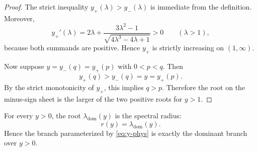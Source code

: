 \begin{proof}
The strict inequality \(y_+(\lambda)>y_-(\lambda)\) is immediate from the definition.
Moreover,
\[
y_+'(\lambda)=2\lambda+\frac{3\lambda^2-1}{\sqrt{4\lambda^3-4\lambda+1}}>0
\qquad (\lambda>1),
\]
because both summands are positive.
Hence \(y_+\) is strictly increasing on \((1,\infty)\).

Now suppose \(y=y_-(q)=y_+(p)\) with \(0<p<q\).
Then
\[
y_+(q)>y_-(q)=y=y_+(p).
\]
By the strict monotonicity of \(y_+\), this implies \(q>p\).
Therefore the root on the minus-sign sheet is the larger of the two positive roots for \(y>1\).
\end{proof}

\begin{proposition}\label{prop:global-dominance}
For every $y>0$, the root $\lambda_{\mathrm{dom}}(y)$ is the spectral radius:
\[
r(y)=\lambda_{\mathrm{dom}}(y).
\]
Hence the branch parameterized by \eqref{eq:y-phys} is exactly the dominant branch over $y>0$.
\end{proposition}


